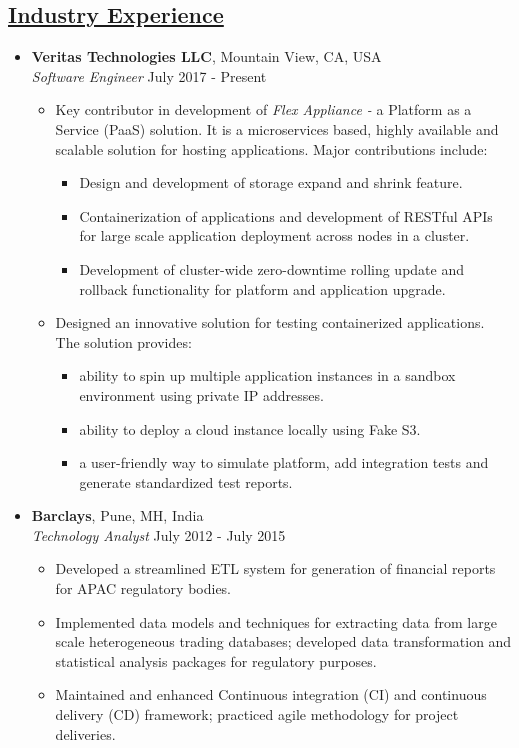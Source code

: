 \documentclass[10pt]{article}
\begin{document}
\subsection*{\underline{Industry Experience}}
\vspace{-0.1cm}
\begin{itemize}[leftmargin=0.15in]
\item {\bfseries Veritas Technologies LLC}, Mountain View, CA, USA \\
{\sl Software Engineer}  \hfill July 2017 - Present
\vspace{-0.15cm}
\begin{itemize}
\setlength{\itemsep}{0.4em}%
\item Key contributor in development of \textit{Flex Appliance -} a Platform as a Service (PaaS) solution. It is a microservices based, highly available and scalable solution for hosting applications. Major contributions include:
\begin{itemize}
\item Design and development of storage expand and shrink feature.
\item Containerization of applications and development of RESTful APIs for large scale application deployment across nodes in a cluster.
\item Development of cluster-wide zero-downtime rolling update and rollback functionality for platform and application upgrade.
\end{itemize}

\item Designed an innovative solution for testing containerized applications. The solution provides:
\begin{itemize}
\item ability to spin up multiple application instances in a sandbox environment using private IP addresses.
\item ability to deploy a cloud instance locally using Fake S3.
\item a user-friendly way to simulate platform, add integration tests and generate standardized test reports.
\end{itemize}

\end{itemize}

\item  {\bfseries Barclays}, Pune, MH, India \\
{\sl Technology Analyst} \hfill July 2012 - July 2015
\vspace{-0.15cm}
\begin{itemize}
\setlength{\itemsep}{0.2em}%
\item Developed a streamlined ETL system for generation of financial reports for APAC regulatory bodies.
\item Implemented data models and techniques for extracting data from large scale heterogeneous trading databases; developed data transformation and statistical analysis packages for regulatory purposes.
\item Maintained and enhanced Continuous integration (CI) and continuous delivery (CD) framework; practiced agile methodology for project deliveries.


\end{itemize}
\end{itemize}
\end{document}
